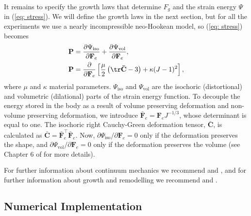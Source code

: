 It remains to specify the growth laws that determine $F_g$ and the strain energy $\Psi$ in 
(\ref{eq: stress}). We will define the growth laws in the next section, but for all the 
experiments we use a nearly incompressible neo-Hookean model, so (\ref{eq: stress}) becomes
\begin{align*}
    \mathbf{P} &= \frac{\partial\Psi_\text{iso}}{\partial \mathbf{F}_e} + \frac{\partial\Psi_\text{vol}}{\partial \mathbf{F}_e}, \\
    \mathbf{P} &= \frac{\partial}{\partial \mathbf{F}_e}\left[\frac{\mu}{2}\left(\tr\mathbf{\bar{C}} - 3\right) + \kappa(J-1)^2\right],
\end{align*}
where $\mu$ and $\kappa$ material parameters. $\Psi_\text{iso}$ and $\Psi_\text{vol}$ are the isochoric (distortional) and volumetric (dilational) parts of the strain energy function. To decouple the energy stored in the body as a result of volume preserving deformation and non-volume preserving deformation, we introduce $\mathbf{\bar{F}}_e = \mathbf{F}_eJ^{-1/3}$, whose determinant is equal to one. The isochoric right Cauchy-Green deformation tensor, $\mathbf{\bar{C}}$, is calculated as $\mathbf{\bar{C}} = \mathbf{\bar{F}}_e^\top \mathbf{\bar{F}}_e$. Now, $\partial\Psi_\text{iso}/\partial \mathbf{F}_e = 0$ only if the deformation preserves the shape, and $\partial\Psi_\text{vol}/\partial \mathbf{F}_e = 0$ only if the deformation preserves the volume (see Chapter 6 of \citep{Holzapfel2002} for more details). \par 
For further information about continuum mechanics we recommend \citep{Marsden1983} and \citep{Holzapfel2002}, and for further information about growth and remodelling we recommend \citep{Goriely2017} and \citep{Yavari2010}.

\subsection{Numerical Implementation}
 
